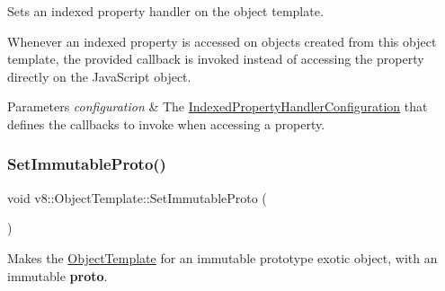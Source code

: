 Sets an indexed property handler on the object template.

Whenever an indexed property is accessed on objects created from this object template, the provided callback is invoked instead of accessing the property directly on the Java\+Script object.


\begin{DoxyParams}{Parameters}
{\em configuration} & The \mbox{\hyperlink{structv8_1_1IndexedPropertyHandlerConfiguration}{Indexed\+Property\+Handler\+Configuration}} that defines the callbacks to invoke when accessing a property. \\
\hline
\end{DoxyParams}
\mbox{\label{classv8_1_1ObjectTemplate_adba49230a24b42f0985494ac86655e54}} 
\subsubsection{\texorpdfstring{Set\+Immutable\+Proto()}{SetImmutableProto()}}
{\footnotesize\ttfamily void v8\+::\+Object\+Template\+::\+Set\+Immutable\+Proto (\begin{DoxyParamCaption}{ }\end{DoxyParamCaption})}

Makes the \mbox{\hyperlink{classv8_1_1ObjectTemplate}{Object\+Template}} for an immutable prototype exotic object, with an immutable {\bfseries proto}. \mbox{\label{classv8_1_1ObjectTemplate_ae3303f3d55370684ac02b02e67712eac}} 
